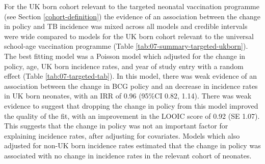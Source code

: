 \documentclass[11pt,twoside]{bristolthesis}
\begin{document}
  For the UK born cohort relevant to the targeted neonatal vaccination programme (see Section \ref{cohort-definition}) the evidence of an association between the change in policy and TB incidence was mixed across all models and credible intervals were wide compared to models for the UK born cohort relevant to the universal school-age vaccination programme (Table \ref{tab:07-summary-targeted-ukborn}). The best fitting model was a Poisson model which adjusted for the change in policy, age, UK born incidence rates, and year of study entry with a random effect (Table \ref{tab:07-targeted-tab}). In this model, there was weak evidence of an association between the change in BCG policy and an decrease in incidence rates in UK born neonates, with an IRR of 0.96 (95\%CI 0.82, 1.14). There was weak evidence to suggest that dropping the change in policy from this model improved the quality of the fit, with an improvement in the LOOIC score of 0.92 (SE 1.07). This suggests that the change in policy was not an important factor for explaining incidence rates, after adjusting for covariates. Models which also adjusted for non-UK born incidence rates estimated that the change in policy was associated with no change in incidence rates in the relevant cohort of neonates.
  
\end{document}
